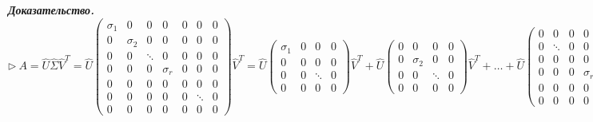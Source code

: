 \bigskip
\textbf{\textit{Доказательство.}} $\rhd \ A = \hat{U} \hat{\Sigma} \hat{V}^T = \hat{U} \begin{pmatrix} \sigma_1 & 0 & 0 & 0 & 0 & 0 & 0 \\  0 & \sigma_2 & 0 & 0 & 0 & 0 & 0 \\ 0 & 0 & \ddots & 0 & 0 & 0 & 0 \\ 0 & 0 & 0 & \sigma_r & 0 & 0 & 0 \\ 0 & 0 & 0 & 0 & 0 & 0 & 0 \\ 0 & 0 & 0 & 0 & 0 & \ddots & 0 \\ 0 & 0 & 0 & 0 & 0 & 0 & 0 \end{pmatrix} \hat{V}^T = \hat{U} \begin{pmatrix} \sigma_1 & 0 & 0 & 0 \\  0 & 0 & 0 & 0 \\ 0 & 0 & \ddots & 0 \\ 0 & 0 & 0 & 0 \end{pmatrix} \hat{V}^T + \hat{U} \begin{pmatrix} 0 & 0 & 0 & 0 \\  0 & \sigma_2 & 0 & 0 \\ 0 & 0 & \ddots & 0 \\ 0 & 0 & 0 & 0 \end{pmatrix} \hat{V}^T + \dots + \hat{U} \begin{pmatrix} 0 & 0 & 0 & 0 & 0 & 0 \\  0 & \ddots & 0 & 0 & 0 & 0\\ 0 & 0 & 0 & 0 & 0 & 0 \\ 0 & 0 & 0 & \sigma_r & 0 & 0 \\ 0 & 0 & 0 & 0 & \ddots & 0 \\ 0 & 0 & 0 & 0 & 0 & 0 \end{pmatrix} \hat{V}^T = \hat{U} \begin{pmatrix} \sigma_1 v_1^T \\ 0 \\ \vdots \\ 0 \end{pmatrix} + \hat{U} \begin{pmatrix} 0 \\ \sigma_2 v_2^T \\ \vdots \\ 0 \end{pmatrix} + \dots + \hat{U} \begin{pmatrix} 0 \\ \vdots \\ 0 \\ \sigma_r v_r^T \\ 0 \\ \vdots \\ 0 \end{pmatrix} = u_1 \sigma_1 v_1^T + u_2 \sigma_2 v_2^T + \dots + u_r \sigma_r v_r^T \ \lhd$

